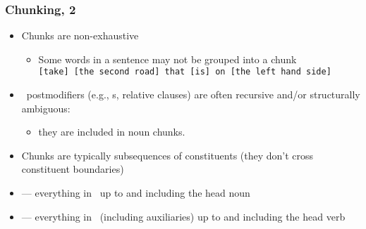\begin{frame}[fragile]
  \frametitle{Chunking, 2}

  \begin{itemize}
        \item<1-> Chunks are non-exhaustive
          \begin{itemize}
          \item Some words in a sentence may not be grouped into a
            chunk\\
            \verb![take] [the second road] that [is] on [the left hand side]!
          \end{itemize}
        \item<2-> \NP\ postmodifiers (e.g., \PP s, relative clauses) are often recursive and/or structurally ambiguous:
          \begin{itemize}
          \item they are  included in noun chunks.
          \end{itemize}
        \item<3-> Chunks are typically subsequences of constituents (they
          don't cross constituent boundaries)
        \item<4->  --- everything in \NP\ up to and
          including the head noun
        \item<5->  --- everything in \VP\ (including
          auxiliaries) up to and including the head verb
  \end{itemize}

\end{frame}



